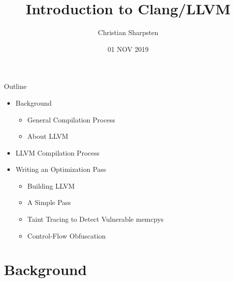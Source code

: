 \documentclass{beamer}
\title{Introduction to Clang/LLVM}
\author{Christian Sharpsten}
\date{01 NOV 2019}
\begin{document}

\begin{frame}
    \maketitle
\end{frame}

\begin{frame}{Outline}
    \begin{itemize}
        \item Background
        \begin{itemize}
            \item General Compilation Process
            \item About LLVM
        \end{itemize}
        \vspace{1ex}

        \item LLVM Compilation Process
        \vspace{1ex}

        \item Writing an Optimization Pass
        \begin{itemize}
            \item Building LLVM
            \item A Simple Pass
            \item Taint Tracing to Detect Vulnerable memcpys
            \item Control-Flow Obfuscation
        \end{itemize}
    \end{itemize}
\end{frame}


\section{Background}

\end{document}
